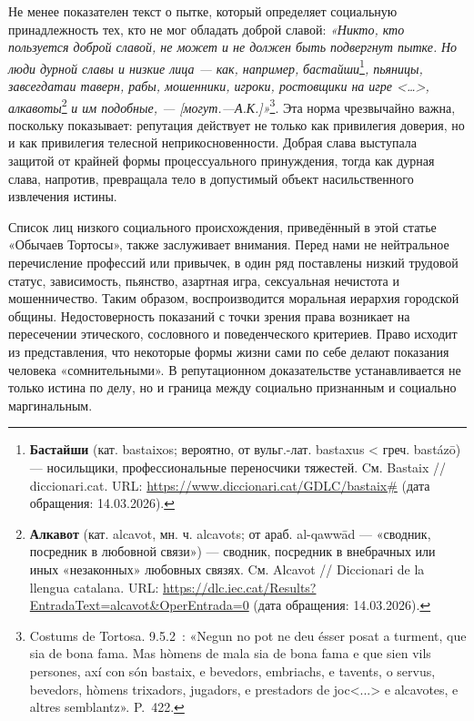 Не менее показателен текст о пытке, который определяет социальную принадлежность тех, кто не мог обладать доброй славой: \emph{«Никто, кто пользуется доброй славой, не может и не должен быть подвергнут пытке. }\emph{Но люди дурной славы и низкие лица --- как, например, }\emph{бастайши}\footnote{\textbf{Бастайши}\textbf{ }(кат. bastaixos; вероятно, от вульг.-лат. bastaxus < греч. bastázō) --- носильщики, профессиональные переносчики тяжестей. Cм. Bastaix // diccionari.cat. URL: \url{https://www.diccionari.cat/GDLC/bastaix\#} (дата обращения: 14.03.2026).}\emph{, пьяницы, завсегдатаи таверн, рабы, мошенники, игроки, ростовщики на игре <…>, }\emph{алкавоты}\footnote{\textbf{Алкавот}\textbf{ }(кат. alcavot, мн. ч. alcavots; от араб. al-qawwād --- «сводник, посредник в любовной связи») --- сводник, посредник в внебрачных или иных «незаконных» любовных связях. Cм. Alcavot // Diccionari de la llengua catalana. URL: \url{https://dlc.iec.cat/Results?EntradaText=alcavot&OperEntrada=0} (дата обращения: 14.03.2026).}\emph{ и им подобные, --- [могут.---А.К.]»}\footnote{Costums de Tortosa. 9.5.2~: «Negun no pot ne deu ésser posat a turment, que sia de bona fama. Mas hòmens de mala sia de bona fama e que sien vils persones, axí con són bastaix, e bevedors, embriachs, e tavents, o servus, bevedors, hòmens trixadors, jugadors, e prestadors de joc<...> e alcavotes, e altres semblantz». P.~422.}. Эта норма чрезвычайно важна, поскольку показывает: репутация действует не только как привилегия доверия, но и как привилегия телесной неприкосновенности. Добрая слава выступала защитой от крайней формы процессуального принуждения, тогда как дурная слава, напротив, превращала тело в допустимый объект насильственного извлечения истины.

Список лиц низкого социального происхождения, приведённый в этой статье «Обычаев Тортосы», также заслуживает внимания. Перед нами не нейтральное перечисление профессий или привычек, в один ряд поставлены низкий трудовой статус, зависимость, пьянство, азартная игра, сексуальная нечистота и мошенничество. Таким образом, воспроизводится моральная иерархия городской общины. Недостоверность показаний с точки зрения права возникает на пересечении этического, сословного и поведенческого критериев. Право исходит из представления, что некоторые формы жизни сами по себе делают показания человека «сомнительными». В репутационном доказательстве устанавливается не только истина по делу, но и граница между социально признанным и социально маргинальным.

